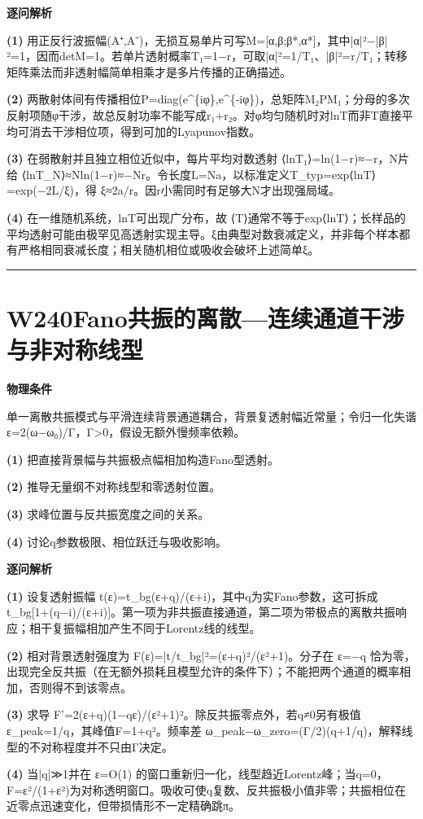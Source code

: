 \documentclass[UTF8,a4paper,11pt,oneside,openany]{ctexbook}
\begin{document}
\par\medskip\noindent\textbf{逐问解析}
\par\noindent\textbf{(1)} 用正反行波振幅(A⁺,A⁻)，无损互易单片可写M=[α,β;β*,α*]，其中|α|²−|β|²=1，因而detM=1。若单片透射概率T₁=1−r，可取|α|²=1/T₁、|β|²=r/T₁；转移矩阵乘法而非透射幅简单相乘才是多片传播的正确描述。
\par\noindent\textbf{(2)} 两散射体间有传播相位P=diag(e\textasciicircum{}\{iφ\},e\textasciicircum{}\{-iφ\})，总矩阵M₂PM₁；分母的多次反射项随φ干涉，故总反射功率不能写成r₁+r₂。对φ均匀随机时对lnT而非T直接平均可消去干涉相位项，得到可加的Lyapunov指数。
\par\noindent\textbf{(3)} 在弱散射并且独立相位近似中，每片平均对数透射 ⟨lnT₁⟩=ln(1−r)≈−r，N片给 ⟨lnT\_N⟩≈Nln(1−r)≈−Nr。令长度L=Na，以标准定义T\_typ=exp⟨lnT⟩=exp(−2L/ξ)，得 ξ≈2a/r。因r小需同时有足够大N才出现强局域。
\par\noindent\textbf{(4)} 在一维随机系统，lnT可出现广分布，故 ⟨T⟩通常不等于exp⟨lnT⟩；长样品的平均透射可能由极罕见高透射实现主导。ξ由典型对数衰减定义，并非每个样本都有严格相同衰减长度；相关随机相位或吸收会破坏上述简单ξ。

\par\bigskip\hrule\bigskip
\section*{W240\quad Fano共振的离散—连续通道干涉与非对称线型}
\textbf{物理条件}\par 单一离散共振模式与平滑连续背景通道耦合，背景复透射幅近常量；令归一化失谐ε=2(ω−ω₀)/Γ，Γ>0，假设无额外慢频率依赖。
\par\noindent\textbf{(1)} 把直接背景幅与共振极点幅相加构造Fano型透射。
\par\noindent\textbf{(2)} 推导无量纲不对称线型和零透射位置。
\par\noindent\textbf{(3)} 求峰位置与反共振宽度之间的关系。
\par\noindent\textbf{(4)} 讨论q参数极限、相位跃迁与吸收影响。

\par\medskip\noindent\textbf{逐问解析}
\par\noindent\textbf{(1)} 设复透射振幅 t(ε)=t\_bg(ε+q)/(ε+i)，其中q为实Fano参数，这可拆成 t\_bg[1+(q−i)/(ε+i)]。第一项为非共振直接通道，第二项为带极点的离散共振响应；相干复振幅相加产生不同于Lorentz线的线型。
\par\noindent\textbf{(2)} 相对背景透射强度为 F(ε)=|t/t\_bg|²=(ε+q)²/(ε²+1)。分子在 ε=−q 恰为零，出现完全反共振（在无额外损耗且模型允许的条件下）；不能把两个通道的概率相加，否则得不到该零点。
\par\noindent\textbf{(3)} 求导 F'=2(ε+q)(1−qε)/(ε²+1)²。除反共振零点外，若q≠0另有极值 ε\_peak=1/q，其峰值F=1+q²。频率差 ω\_peak−ω\_zero=(Γ/2)(q+1/q)，解释线型的不对称程度并不只由Γ决定。
\par\noindent\textbf{(4)} 当|q|≫1并在 ε=O(1) 的窗口重新归一化，线型趋近Lorentz峰；当q=0，F=ε²/(1+ε²)为对称透明窗口。吸收可使q复数、反共振极小值非零；共振相位在近零点迅速变化，但带损情形不一定精确跳π。
\end{document}
